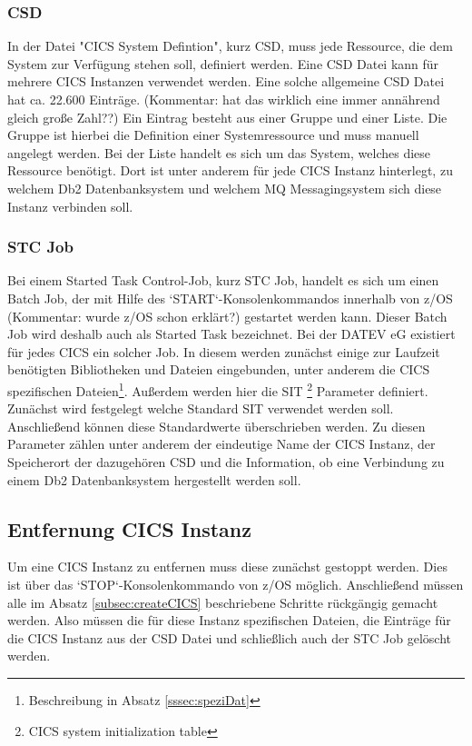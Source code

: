 \subsubsection{CSD}
In der Datei "CICS System Defintion", kurz CSD, muss jede Ressource, die dem System zur Verfügung stehen soll, definiert werden.
Eine CSD Datei kann für mehrere CICS Instanzen verwendet werden.
Eine solche allgemeine CSD Datei hat ca. 22.600 Einträge. (Kommentar: hat das wirklich eine immer annährend gleich große Zahl??)
Ein Eintrag besteht aus einer Gruppe und einer Liste.
Die Gruppe ist hierbei die Definition einer Systemressource und muss manuell angelegt werden.
Bei der Liste handelt es sich um das System, welches diese Ressource benötigt.
Dort ist unter anderem für jede CICS Instanz hinterlegt, zu welchem Db2 Datenbanksystem und welchem MQ Messagingsystem sich diese Instanz verbinden soll.

\subsubsection{STC Job}
Bei einem Started Task Control-Job, kurz STC Job, handelt es sich um einen Batch Job, der mit Hilfe des `START`-Konsolenkommandos innerhalb von z/OS (Kommentar: wurde z/OS schon erklärt?) gestartet werden kann.
Dieser Batch Job wird deshalb auch als Started Task bezeichnet.\cite{Cassier.2007}
Bei der DATEV eG existiert für jedes CICS ein solcher Job.
In diesem werden zunächst einige zur Laufzeit benötigten Bibliotheken und Dateien eingebunden, unter anderem die CICS spezifischen Dateien\footnote{Beschreibung in Absatz \ref{sssec:speziDat}}.
Außerdem werden hier die SIT \footnote{CICS system initialization table} Parameter definiert.
Zunächst wird festgelegt welche Standard SIT verwendet werden soll.
Anschließend können diese Standardwerte überschrieben werden.
Zu diesen Parameter zählen unter anderem der eindeutige Name der CICS Instanz, der Speicherort der dazugehören CSD und die Information, ob eine Verbindung zu einem Db2 Datenbanksystem hergestellt werden soll.

\subsection{Entfernung CICS Instanz}
Um eine CICS Instanz zu entfernen muss diese zunächst gestoppt werden.
Dies ist über das `STOP`-Konsolenkommando von z/OS möglich.
Anschließend müssen alle im Absatz \ref{subsec:createCICS} beschriebene Schritte rückgängig gemacht werden.
Also müssen die für diese Instanz spezifischen Dateien, die Einträge für die CICS Instanz aus der CSD Datei und schließlich auch der STC Job gelöscht werden.

